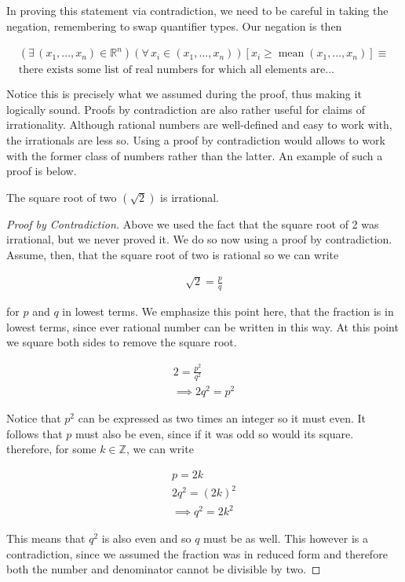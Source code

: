 \documentclass[twoside]{report}
\DeclareMathOperator{\mean}{mean}
\begin{document}
In proving this statement via contradiction, we need to be careful in taking the negation, remembering to swap quantifier types. Our negation is then

\begin{align*}
	(\exists \, (x_1, \dots, x_n) \in \mathbb{R}^n)(\forall \, x_i \in (x_1, \dots, x_n))[x_i \ge \mean(x_1, \dots, x_n)] \equiv \\
	\text{there exists some list of real numbers for which all elements are...}
\end{align*}

Notice this is precisely what we assumed during the proof, thus making it logically sound. Proofs by contradiction are also rather useful for claims of irrationality. Although rational numbers are well-defined and easy to work with, the irrationals are less so. Using a proof by contradiction would allows to work with the former class of numbers rather than the latter. An example of such a proof is below.

\vspace{\baselineskip}
\begin{theorem}
	The square root of two $(\sqrt{2})$ is irrational.
\end{theorem}

\begin{proof}[Proof by Contradiction]
	Above we used the fact that the square root of 2 was irrational, but we never proved it. We do so now using a proof by contradiction. Assume, then, that the square root of two is rational so we can write
	
	\begin{align*}
		\sqrt{2} = \frac{p}{q}
	\end{align*}
	
	for $p$ and $q$ in lowest terms. We emphasize this point here, that the fraction is in lowest terms, since ever rational number can be written in this way. At this point we square both sides to remove the square root.
	
	\begin{align*}
		2 = \frac{p^2}{q^2} \\
		\implies 2 q^2 = p^2
	\end{align*}
	
	Notice that $p^2$ can be expressed as two times an integer so it must even. It follows that $p$ must also be even, since if it was odd so would its square. therefore, for some $k \in \mathbb{Z}$, we can write
	
	\begin{align*}
		p = 2k \\
		2 q^2 = (2k)^2 \\
		\implies q^2 = 2k^2
	\end{align*}
	
	This means that $q^2$ is also even and so $q$ must be as well. This however is a contradiction, since we assumed the fraction was in reduced form and therefore both the number and denominator cannot be divisible by two.
\end{proof}
\vspace{\baselineskip}
\end{document}
